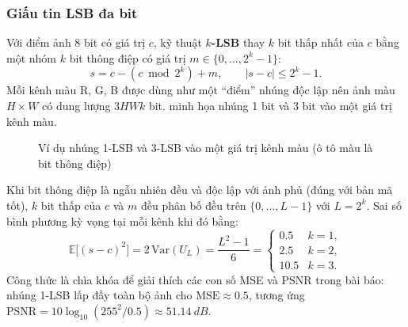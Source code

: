\subsubsection{Giấu tin LSB đa bit}

Với điểm ảnh 8 bit có giá trị $c$, kỹ thuật \textbf{$k$-LSB} thay $k$ bit thấp nhất của $c$ bằng
một nhóm $k$ bit thông điệp có giá trị $m \in \{0, \dots, 2^k - 1\}$:
\begin{equation}
  s = c - (c \bmod 2^k) + m, \qquad |s - c| \le 2^k - 1.
  \label{eq:klsb}
\end{equation}
Mỗi kênh màu R, G, B được dùng như một ``điểm'' nhúng độc lập nên ảnh màu $H \times W$ có dung
lượng $3HWk$ bit.  minh họa nhúng 1 bit và 3 bit vào một giá trị kênh màu.

\begin{figure}[H]
\centering
{}
\caption{Ví dụ nhúng 1-LSB và 3-LSB vào một giá trị kênh màu (ô tô màu là bit thông điệp)}
\label{fig:lsb-example}
\end{figure}

Khi bit thông điệp là ngẫu nhiên đều và độc lập với ảnh phủ (đúng với bản mã tốt), $k$ bit thấp
của $c$ và $m$ đều phân bố đều trên $\{0,\dots,L-1\}$ với $L = 2^k$. Sai số bình phương kỳ vọng
tại mỗi kênh khi đó bằng:
\begin{equation}
  \mathbb{E}\bigl[(s-c)^2\bigr] = 2\,\mathrm{Var}(U_L) = \frac{L^2 - 1}{6}
  = \begin{cases} 0.5 & k = 1,\\ 2.5 & k = 2,\\ 10.5 & k = 3. \end{cases}
  \label{eq:lsb-mse}
\end{equation}
Công thức  là chìa khóa để giải thích các con số MSE và PSNR trong bài báo:
nhúng 1-LSB lấp đầy toàn bộ ảnh cho $\mathrm{MSE} \approx 0.5$, tương ứng
$\mathrm{PSNR} = 10\log_{10}(255^2/0.5) \approx \SI{51.14}{dB}$.

